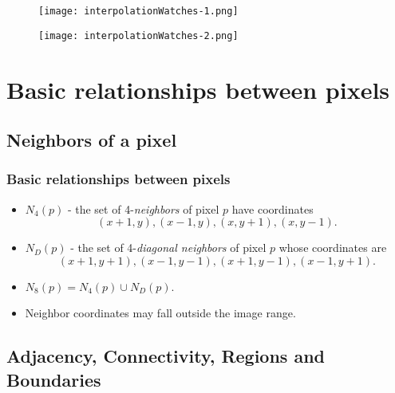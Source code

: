 
\begin{frame}
\begin{figure}
\texttt{[image: interpolationWatches-1.png]}
\end{figure}
\begin{figure}
\texttt{[image: interpolationWatches-2.png]}
\end{figure}
\end{frame}


\section{Basic relationships between pixels}


\subsection{Neighbors of a pixel}


\begin{frame}
\frametitle{Basic relationships between pixels}
\begin{itemize}
\item $N_{4}(p)$ - the set of 4-\textit{neighbors} of pixel $p$ have coordinates \[(x+1,y),(x-1,y),(x,y+1),(x,y-1).\]
\item $N_{D}(p)$ - the set of 4-\textit{diagonal neighbors} of pixel $p$ whose coordinates are \[(x+1,y+1),(x-1,y-1),(x+1,y-1),(x-1,y+1).\]
\item $N_{8}(p) = N_{4}(p) \cup N_{D}(p)$.
\item Neighbor coordinates may fall outside the image range.
\end{itemize}
\end{frame}


\subsection{Adjacency, Connectivity, Regions and Boundaries}

